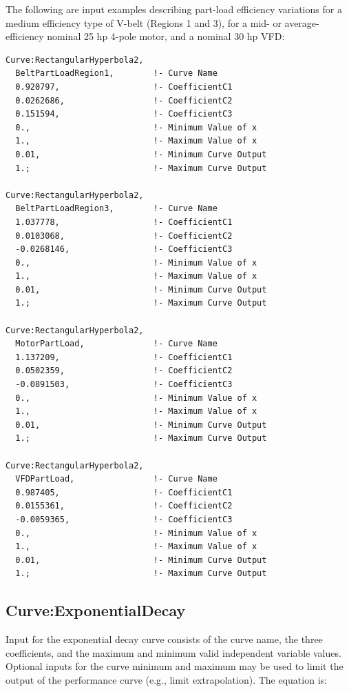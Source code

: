The following are input examples describing part-load efficiency variations for a medium efficiency type of V-belt (Regions 1 and 3), for a mid- or average-efficiency nominal 25 hp 4-pole motor, and a nominal 30 hp VFD:

\begin{lstlisting}
Curve:RectangularHyperbola2,
  BeltPartLoadRegion1,        !- Curve Name
  0.920797,                   !- CoefficientC1
  0.0262686,                  !- CoefficientC2
  0.151594,                   !- CoefficientC3
  0.,                         !- Minimum Value of x
  1.,                         !- Maximum Value of x
  0.01,                       !- Minimum Curve Output
  1.;                         !- Maximum Curve Output

Curve:RectangularHyperbola2,
  BeltPartLoadRegion3,        !- Curve Name
  1.037778,                   !- CoefficientC1
  0.0103068,                  !- CoefficientC2
  -0.0268146,                 !- CoefficientC3
  0.,                         !- Minimum Value of x
  1.,                         !- Maximum Value of x
  0.01,                       !- Minimum Curve Output
  1.;                         !- Maximum Curve Output

Curve:RectangularHyperbola2,
  MotorPartLoad,              !- Curve Name
  1.137209,                   !- CoefficientC1
  0.0502359,                  !- CoefficientC2
  -0.0891503,                 !- CoefficientC3
  0.,                         !- Minimum Value of x
  1.,                         !- Maximum Value of x
  0.01,                       !- Minimum Curve Output
  1.;                         !- Maximum Curve Output

Curve:RectangularHyperbola2,
  VFDPartLoad,                !- Curve Name
  0.987405,                   !- CoefficientC1
  0.0155361,                  !- CoefficientC2
  -0.0059365,                 !- CoefficientC3
  0.,                         !- Minimum Value of x
  1.,                         !- Maximum Value of x
  0.01,                       !- Minimum Curve Output
  1.;                         !- Maximum Curve Output
\end{lstlisting}

\subsection{Curve:ExponentialDecay}\label{curveexponentialdecay}

Input for the exponential decay curve consists of the curve name, the three coefficients, and the maximum and minimum valid independent variable values. Optional inputs for the curve minimum and maximum may be used to limit the output of the performance curve (e.g., limit extrapolation). The equation is:

